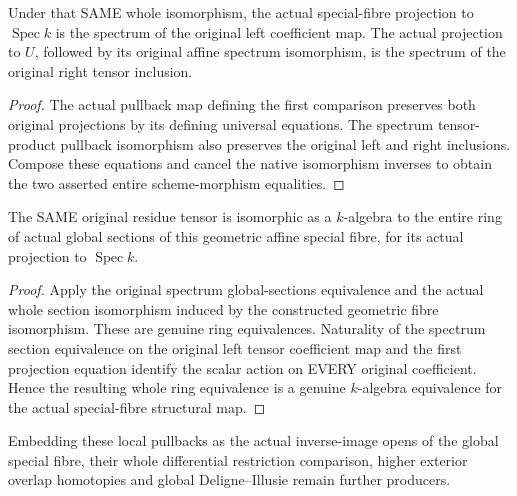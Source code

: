 \begin{theorem}
\label{thm:witt-two-actual-affine-special-fibre-projections}
\leanok
Under that SAME whole isomorphism, the actual special-fibre
projection to $\operatorname{Spec}k$ is the spectrum of the
original left coefficient map. The actual projection to $U$,
followed by its original affine spectrum isomorphism, is the
spectrum of the original right tensor inclusion.
\end{theorem}
\begin{proof}
The actual pullback map defining the first comparison preserves
both original projections by its defining universal equations.
The spectrum tensor-product pullback isomorphism also preserves
the original left and right inclusions. Compose these equations
and cancel the native isomorphism inverses to obtain the two
asserted entire scheme-morphism equalities.
\end{proof}

\begin{theorem}
\label{thm:witt-two-actual-affine-special-fibre-section-ring}
\leanok
The SAME original residue tensor is isomorphic as a $k$-algebra
to the entire ring of actual global sections of this geometric
affine special fibre, for its actual projection to
$\operatorname{Spec}k$.
\end{theorem}
\begin{proof}
Apply the original spectrum global-sections equivalence and the
actual whole section isomorphism induced by the constructed
geometric fibre isomorphism. These are genuine ring equivalences.
Naturality of the spectrum section equivalence on the original
left tensor coefficient map and the first projection equation
identify the scalar action on EVERY original coefficient. Hence
the resulting whole ring equivalence is a genuine $k$-algebra
equivalence for the actual special-fibre structural map.
\end{proof}

Embedding these local pullbacks as the actual inverse-image
opens of the global special fibre, their whole differential
restriction comparison, higher exterior overlap homotopies and
global Deligne--Illusie remain further producers.

